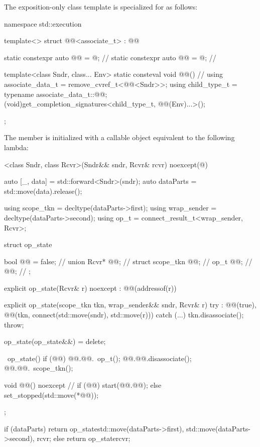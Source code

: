 \pnum
The exposition-only class template 
is specialized for  as follows:
%
\begin{codeblock}
namespace std::execution {
  template<>
  struct @@<associate_t> : @@ {
    static constexpr auto @@ = @\seebelow@;                // \expos
    static constexpr auto @@ = @\seebelow@;                    // \expos

    template<class Sndr, class... Env>
      static consteval void @@() {                     // \expos
        using associate_data_t = remove_cvref_t<@@<Sndr>>;
        using child_type_t = typename associate_data_t::@@;
        (void)get_completion_signatures<child_type_t, @@(Env)...>();
    }
  };
}
\end{codeblock}

\pnum
The member 
is initialized with a callable object equivalent to the following lambda:

\begin{codeblock}
[]<class Sndr, class Rcvr>(Sndr&& sndr, Rcvr& rcvr) noexcept(@\seebelow@) {
  auto [_, data] = std::forward<Sndr>(sndr);
  auto dataParts = std::move(data).release();

  using scope_tkn = decltype(dataParts->first);
  using wrap_sender = decltype(dataParts->second);
  using op_t = connect_result_t<wrap_sender, Rcvr>;

  struct op_state {
    bool @@ = false;    // \expos
    union {
      Rcvr* @@;               // \expos
      struct {
        scope_tkn @@;        // \expos
        op_t @@;                // \expos
      } @@;                  // \expos
    };

    explicit op_state(Rcvr& r) noexcept
      : @@(addressof(r)) {}

    explicit op_state(scope_tkn tkn, wrap_sender&& sndr, Rcvr& r) try
      : @@(true),
        @@(tkn, connect(std::move(sndr), std::move(r))) {
    }
    catch (...) {
      tkn.disassociate();
      throw;
    }

    op_state(op_state&&) = delete;

    ~op_state() {
      if (@@) {
        @@.@@.~op_t();
        @@.@@.disassociate();
        @@.@@.~scope_tkn();
      }
    }

    void @@() noexcept {       // \expos
      if (@@)
        start(@@.@@);
      else
        set_stopped(std::move(*@@));
    }
  };

  if (dataParts)
    return op_state{std::move(dataParts->first), std::move(dataParts->second), rcvr};
  else
    return op_state{rcvr};
}
\end{codeblock}

